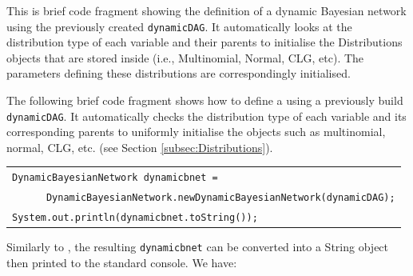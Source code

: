 This is brief code fragment showing the definition of a dynamic Bayesian network using the previously created \texttt{dynamicDAG}. It automatically looks at the distribution type of each variable and their parents to initialise the Distributions objects that are stored inside (i.e., Multinomial, Normal, CLG, etc). The parameters defining these distributions are correspondingly initialised.

The following brief code fragment shows how to define a  using a previously build \texttt{dynamicDAG}. It automatically checks the distribution type of each variable and its corresponding parents to uniformly initialise the  objects such as multinomial, normal, CLG, etc. (see Section \ref{subsec:Distributions}).

\vspace{-0.1in}
\begin{table}[H]
\begin{tabular}{l} \hline  
        \texttt{DynamicBayesianNetwork dynamicbnet =}\\ \texttt{~~~~~~DynamicBayesianNetwork.newDynamicBayesianNetwork(dynamicDAG);}\\ 
        \texttt{System.out.println(dynamicbnet.toString());}\\ \hline 
\end{tabular}
\end{table}      


Similarly to , the resulting \texttt{dynamicbnet} can be converted into a String object then printed to the standard console. We have:

